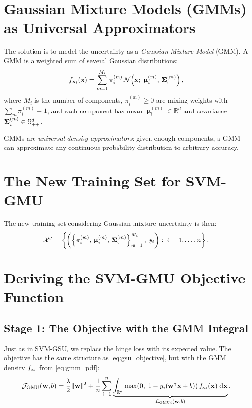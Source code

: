 \documentclass[11pt, letterpaper]{article}
\newcommand{\bSigma}{\vb{\Sigma}}
\newcommand{\bmu}{\boldsymbol{\upmu}}
\newcommand{\R}{\mathbb{R}}
\newcommand{\setX}{\mathcal{X}}
\newcommand{\loss}{\mathcal{L}}
\newcommand{\obj}{\mathcal{J}}
\newcommand{\Norm}{\mathcal{N}}
\begin{document}
\section{Gaussian Mixture Models (GMMs) as Universal Approximators}

The solution is to model the uncertainty as a \emph{Gaussian Mixture Model} (GMM). A GMM is a weighted sum of several Gaussian distributions:
\begin{equation}\label{eq:gmm_pdf}
    f_{\vb{x}_i}(\vb{x}) = \sum_{m=1}^{M_i} \pi_i^{(m)}\, \Norm\!\left(\vb{x};\; \bmu_i^{(m)},\, \bSigma_i^{(m)}\right),
\end{equation}
where $M_i$ is the number of components, $\pi_i^{(m)} \geq 0$ are mixing weights with $\sum_m \pi_i^{(m)} = 1$, and each component has mean $\bmu_i^{(m)} \in \R^d$ and covariance $\bSigma_i^{(m)} \in \mathbb{S}^d_{++}$.

GMMs are \emph{universal density approximators}: given enough components, a GMM can approximate any continuous probability distribution to arbitrary accuracy.

\section{The New Training Set for SVM-GMU}\label{sec:gmu_training_set}

The new training set considering Gaussian mixture uncertainty is then:
\begin{equation}\label{eq:gmu_training_set}
    \setX'' = \left\{ \left(\left\{\pi_i^{(m)},\, \bmu_i^{(m)},\, \bSigma_i^{(m)}\right\}_{m=1}^{M_i},\; y_i\right) :\; i = 1, \ldots, n \right\}.
\end{equation}

\section{Deriving the SVM-GMU Objective Function}\label{sec:gmu_objective}

\subsection{Stage 1: The Objective with the GMM Integral}

Just as in SVM-GSU, we replace the hinge loss with its expected value. The objective has the same structure as \cref{eq:gsu_objective}, but with the GMM density $f_{\vb{x}_i}$ from \cref{eq:gmm_pdf}:
\begin{equation}\label{eq:gmu_obj_integral}
    \obj_{\text{GMU}}(\vb{w}, b) = \frac{\lambda}{2}\|\vb{w}\|^2 + \frac{1}{n}\sum_{i=1}^{n} \underbrace{\int_{\R^d} \max\!\left(0,\; 1 - y_i\!\left(\vb{w}^{\intercal} \vb{x} + b\right)\right) f_{\vb{x}_i}(\vb{x})\, \dd{\vb{x}}}_{{\loss_{\text{GMU}}}_{i}(\vb{w}, b)}.
\end{equation}
\end{document}
